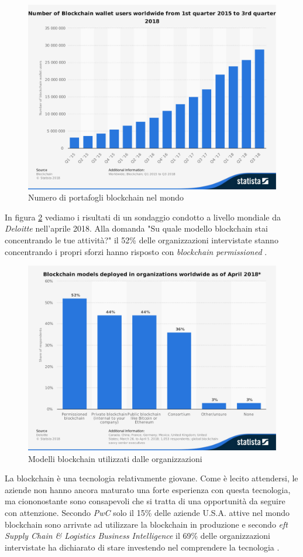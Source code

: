 \begin{figure}[H]
	\centering
	\includegraphics[width=.5\linewidth]{images/chap_intro/number-of-blockchain-wallet.pdf}
	\caption{Numero di portafogli blockchain nel mondo \cite{number-of-blockchain-wallet}}
	\label{fig:number-of-blockchain-wallet}
\end{figure}

In figura \ref{fig:model-focus-for-blockchain}
vediamo i risultati di un sondaggio condotto a livello mondiale da \textit{Deloitte} nell'aprile 2018.
Alla domanda "Su quale modello blockchain stai concentrando le tue attività?"
il 52\% delle organizzazioni intervistate stanno concentrando i propri sforzi hanno risposto con
\textit{blockchain permissioned} \cite{model-focus-for-blockchain}.
\begin{figure}[H]
	\centering
	\includegraphics[width=.55\linewidth]{images/chap_intro/model-focus-for-blockchain.pdf}
	\caption{Modelli blockchain utilizzati dalle organizzazioni \cite{model-focus-for-blockchain}}
	\label{fig:model-focus-for-blockchain}
\end{figure}

La blockchain è una tecnologia relativamente giovane. Come è lecito attendersi, le aziende
non hanno ancora maturato una forte esperienza con questa tecnologia, ma ciononostante
sono consapevoli che si tratta
di una opportunità da seguire con attenzione.
Secondo \textit{PwC} solo il 15\% delle aziende U.S.A.
attive nel mondo blockchain sono arrivate ad utilizzare
la blockchain in produzione \cite{stages-of-blockchain-incorporation} e secondo
\textit{eft Supply Chain \& Logistics Business Intelligence}
il 69\% delle organizzazioni intervistate ha dichiarato di stare investendo
nel comprendere la tecnologia \cite{top-spending-in-supply-chain-industry}.


